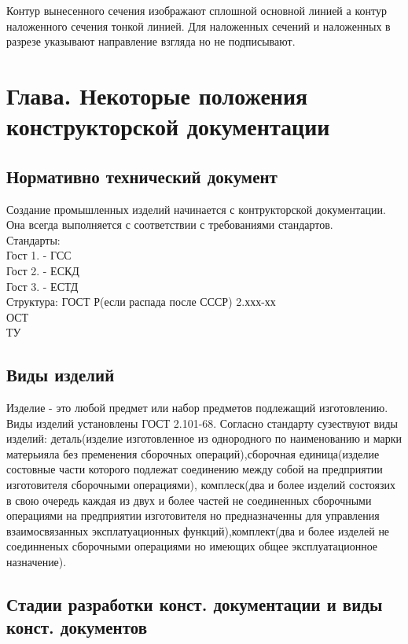 \documentclass[a4paper, 12pt]{article}
\begin{document}
Контур вынесенного сечения изображают сплошной основной линией а контур наложенного сечения тонкой линией. Для наложенных сечений и наложенных в разрезе указывают направление взгляда но не подписывают.\\

\section{Глава. Некоторые положения конструкторской документации}
\subsection{Нормативно технический документ}
Создание промышленных изделий начинается с контрукторской документации. Она всегда выполняется с соответствии с требованиями стандартов.
\\Стандарты:\\
Гост 1. - ГСС\\
Гост 2. - ЕСКД\\
Гост 3. - ЕСТД\\
Структура: ГОСТ Р(если распада после СССР) 2.ххх-хх\\
ОСТ\\
ТУ\\

\subsection{Виды изделий}
Изделие - это любой предмет или набор предметов подлежащий изготовлению. Виды изделий установлены ГОСТ 2.101-68. Согласно стандарту сузествуют виды изделий: деталь(изделие изготовленное из однородного по наименованию и марки матерьияла без пременения сборочных операций),сборочная единица(изделие состовные части которого подлежат соединению между собой на предприятии изготовителя сборочными операциями), комплеск(два и более изделий состоязих в свою очередь каждая из двух и более частей не соединенных сборочными операциями на предприятии изготовителя но предназначенны для управления взаимосвязанных эксплатуационных функций),комплект(два и более изделей не соединненых сборочными операциями но имеющих общее эксплуатационное назначение).\\

\subsection{Стадии разработки конст. документации и виды конст. документов}
\end{document}
